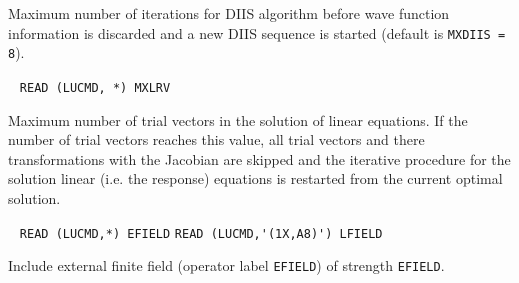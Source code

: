 \begin{description}
  Maximum number of iterations for DIIS algorithm
  before wave function information is discarded and a new DIIS 
  sequence is started
  (default is \verb+MXDIIS = 8+).
 
\item[\Key{MXLRV}] \verb| |\newline
  \verb|READ (LUCMD, *) MXLRV|

  Maximum number of trial vectors in the solution of 
  linear equations. If the number of trial vectors reaches this
  value, all trial vectors and there transformations with the
  Jacobian are skipped and the iterative procedure for the solution
  linear (i.e. the response) equations is restarted from the current 
  optimal solution. 
 
\item[\Key{FIELD }] \verb| |\newline
    \verb|READ (LUCMD,*) EFIELD|\newline
    \verb|READ (LUCMD,'(1X,A8)') LFIELD|

    Include external finite field (operator label \verb+EFIELD+)
    of strength \verb+EFIELD+.
 

\end{description}
